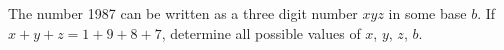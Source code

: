 The number 1987 can be written as a three digit number $xyz$ in some base $b$.  If $x + y + z = 1 + 9 + 8 + 7$,  determine all possible values of $x$,  $y$,  $z$,  $b$.